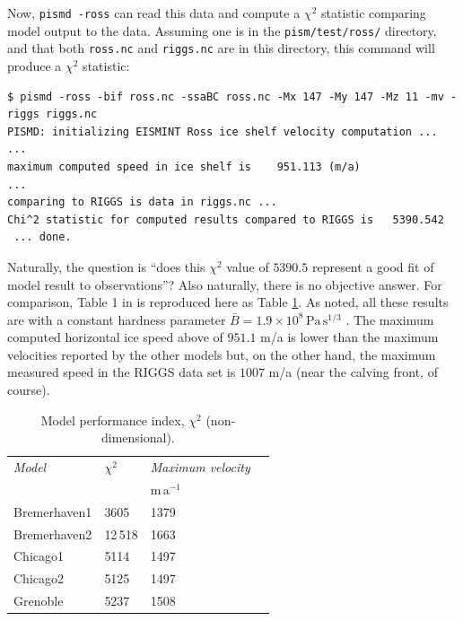 \documentclass[11pt,final]{amsart}
\begin{document}
Now, \verb|pismd -ross| can read this data and compute a $\chi^2$ statistic comparing model output to the data.  Assuming one is in the \verb|pism/test/ross/| directory, and that both \verb|ross.nc| and \verb|riggs.nc| are in this directory, this command will produce a $\chi^2$ statistic:

\small\begin{verbatim}
$ pismd -ross -bif ross.nc -ssaBC ross.nc -Mx 147 -My 147 -Mz 11 -mv -riggs riggs.nc
PISMD: initializing EISMINT Ross ice shelf velocity computation ...
...
maximum computed speed in ice shelf is    951.113 (m/a)
...
comparing to RIGGS is data in riggs.nc ...
Chi^2 statistic for computed results compared to RIGGS is   5390.542
 ... done.
\end{verbatim}
\normalsize

Naturally, the question is ``does this $\chi^2$ value of $5390.5$ represent a good fit of model result to observations''?  Also naturally, there is no objective answer.  For comparison, Table 1 in \cite{MacAyealetal} is reproduced here as Table \ref{tab:chisqr}.  As noted, all these results are with a constant hardness parameter $\bar B = 1.9 \times 10^8 \, \text{Pa}\, \text{s}^{1/3}$ \cite{MacAyealetal}.  The maximum computed horizontal ice speed above of $951.1$ m/a is lower than the maximum velocities reported by the other models but, on the other hand, the maximum measured speed in the RIGGS data set is $1007$ m/a (near the calving front, of course).

\small
\begin{table}[h]
\caption{Model performance index, $\chi^2$ (non-dimensional).  }\label{tab:chisqr}
\begin{tabular}{@{}llll}\hline
\textsl{Model} & $\chi^2$ & \textsl{Maximum velocity} \\
 & & $\text{m}\,\text{a}^{-1}$ \\ \hline
Bremerhaven1 & 3605 & 1379 \\
Bremerhaven2 & 12\,518 & 1663 \\
Chicago1 & 5114 & 1497 \\
Chicago2 & 5125 & 1497 \\
Grenoble & 5237 & 1508 \\
\hline
\end{tabular}
\end{table}
\normalsize
\end{document}
